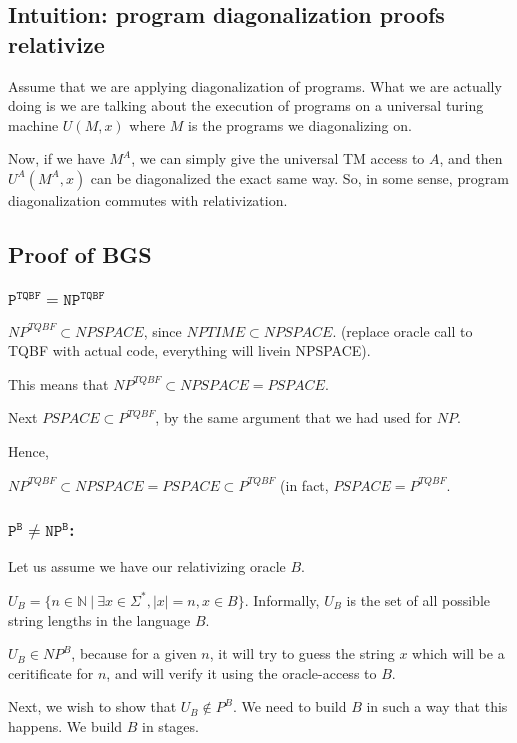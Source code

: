 \subsection{Intuition: program diagonalization proofs relativize}
Assume that we are applying diagonalization of programs. What we are actually
doing is we are talking about the execution of programs on a universal turing
machine $U(M, x)$ where $M$ is the programs we diagonalizing on.

Now, if we have $M^A$, we can simply give the universal TM access to $A$,
and then $U^A(M^A, x)$ can be diagonalized the exact same way. So, in some
sense, program diagonalization commutes with relativization.

\subsection{Proof of BGS}
\subsubsection{$\texttt{P}^{\texttt{TQBF}} = \texttt{NP}^{\texttt{TQBF}}$}
$NP^{TQBF} \subset  NPSPACE$, since $NPTIME \subset NPSPACE$. (replace
oracle call to TQBF with actual code, everything will livein NPSPACE).

This means that $NP^{TQBF} \subset NPSPACE = PSPACE$.

Next $PSPACE \subset P^{TQBF}$, by the same argument that we had used for $NP$.

Hence, 

$NP^{TQBF} \subset  NPSPACE = PSPACE \subset P^{TQBF}$ (in fact, $PSPACE = P^{TQBF}$.

\subsubsection{$\texttt{P}^{\texttt{B}} \neq \texttt{NP}^{\texttt{B}}$:}
Let us assume we have our relativizing oracle $B$.

$U_B = \{ n \in \mathbb{N}~\vert~\exists x \in \Sigma^*,  |x| = n, x \in B \}$.
Informally, $U_B$ is the set of all possible string lengths in the language $B$.


$U_B \in NP^B$, because for a given $n$, it will try to guess the string $x$
which will be a ceritificate for $n$, and will verify it using the oracle-access
to $B$.


Next, we wish to show that $U_B \notin P^B$. We need to build $B$ in such a way
that this happens. We build $B$ in stages.

